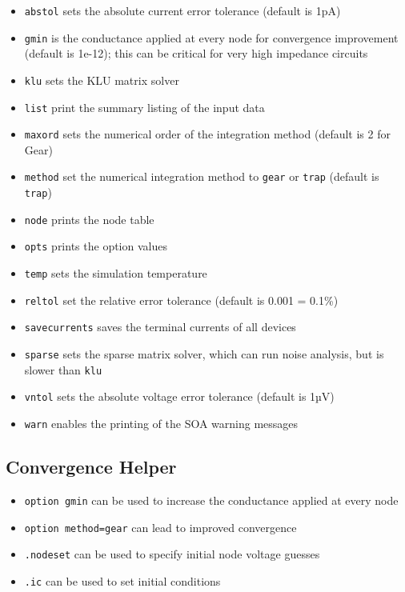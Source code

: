 \documentclass[
  a4paper,
  DIV=11,
  numbers=noendperiod]{scrartcl}
\providecommand{\tightlist}{%
  \setlength{\itemsep}{0pt}\setlength{\parskip}{0pt}}\usepackage{longtable,booktabs,array}
\begin{document}
\begin{itemize}
\tightlist
\item
  \texttt{abstol} sets the absolute current error tolerance (default is
  1pA)
\item
  \texttt{gmin} is the conductance applied at every node for convergence
  improvement (default is 1e-12); this can be critical for very high
  impedance circuits
\item
  \texttt{klu} sets the KLU matrix solver
\item
  \texttt{list} print the summary listing of the input data
\item
  \texttt{maxord} sets the numerical order of the integration method
  (default is 2 for Gear)
\item
  \texttt{method} set the numerical integration method to \texttt{gear}
  or \texttt{trap} (default is \texttt{trap})
\item
  \texttt{node} prints the node table
\item
  \texttt{opts} prints the option values
\item
  \texttt{temp} sets the simulation temperature
\item
  \texttt{reltol} set the relative error tolerance (default is 0.001 =
  0.1\%)
\item
  \texttt{savecurrents} saves the terminal currents of all devices
\item
  \texttt{sparse} sets the sparse matrix solver, which can run noise
  analysis, but is slower than \texttt{klu}
\item
  \texttt{vntol} sets the absolute voltage error tolerance (default is
  1µV)
\item
  \texttt{warn} enables the printing of the SOA warning messages
\end{itemize}

\subsection{Convergence Helper}\label{convergence-helper}

\begin{itemize}
\tightlist
\item
  \texttt{option\ gmin} can be used to increase the conductance applied
  at every node
\item
  \texttt{option\ method=gear} can lead to improved convergence
\item
  \texttt{.nodeset} can be used to specify initial node voltage guesses
\item
  \texttt{.ic} can be used to set initial conditions
\end{itemize}
\end{document}
